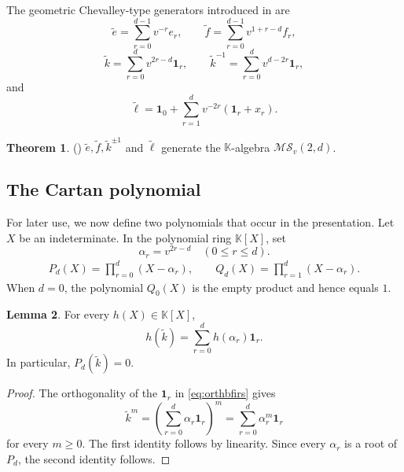 \documentclass[12pt]{amsart}
\numberwithin{equation}{section}
\theoremstyle{definition}
\newtheorem{theorem}{Theorem}[section]
\newtheorem{lemma}[theorem]{Lemma}
\theoremstyle{definition}
\newcommand{\kk}{\mathbb K}
\newcommand{\MS}{\mathcal{MS}_v(2,d)}
\newcommand{\te}{\widetilde e}
\newcommand{\tf}{\widetilde f}
\newcommand{\tk}{\widetilde k}
\newcommand{\tell}{\widetilde\ell}
\begin{document}
The geometric Chevalley-type generators introduced in \cite[Theorem~3.5]{Ros18} are
$$
\te=\sum_{r=0}^{d-1}v^{-r}e_r,
\qquad
\tf=\sum_{r=0}^{d-1}v^{1+r-d}f_r,
$$
$$
\tk=\sum_{r=0}^{d}v^{2r-d}\mathbf1_r,
\qquad
\tk^{-1}=\sum_{r=0}^{d}v^{d-2r}\mathbf1_r,
$$
and
$$
\tell=\mathbf1_0+
\sum_{r=1}^{d}v^{-2r}(\mathbf1_r+x_r).
$$
\begin{theorem}\label{thm:rosgenMS}(\cite[Theorem~3.5]{Ros18})
$\te,\tf,\tk^{\pm 1}$ and $\tell$ generate the $\kk$-algebra $\MS$.
\end{theorem}


\subsection{The Cartan polynomial}\label{subsec:geomrel}

For later use, we now define two polynomials that occur in the presentation. Let $X$ be an indeterminate. In the polynomial ring $\kk[X]$, set
\begin{equation}\label{eq:alpharv}
    \alpha_r=v^{2r-d}\quad(0\le r\le d).
\end{equation}
\begin{align}\label{eq:newrela}
    P_d(X)=\prod_{r=0}^{d}(X-\alpha_r),\qquad
Q_d(X)=\prod_{r=1}^{d}(X-\alpha_r).
\end{align}
When $d=0$, the polynomial $Q_0(X)$ is the empty product and hence equals $1$.


\begin{lemma}\label{lem:geomcalc}
For every $h(X)\in\kk[X]$,
$$
h(\tk)=\sum_{r=0}^{d}h(\alpha_r)\mathbf1_r.
$$
In particular, $P_d(\tk)=0$.
\end{lemma}

\begin{proof}
The orthogonality of the $\mathbf1_r$ in \eqref{eq:orthbfirs} gives
$$
\tk^m=
\left(\sum_{r=0}^{d}\alpha_r\mathbf1_r\right)^m
=\sum_{r=0}^{d}\alpha_r^m\mathbf1_r
$$
for every $m\ge0$. The first identity follows by linearity. Since every $\alpha_r$ is a root of $P_d$, the second identity follows.
\end{proof}
\end{document}
